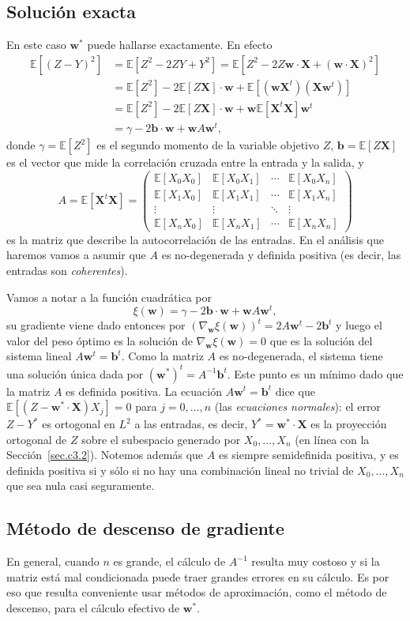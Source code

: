 \documentclass[12pt, a4paper]{amsbook}
\newcommand{\E}{{\mathbb E}}
\newcommand{\ww}{{\mathbf w}}
\newcommand{\bb}{{\mathbf b}}
\newcommand{\XX}{{\mathbf X}}
\theoremstyle{remark}
\theoremstyle{definition}
\numberwithin{section}{chapter}
\numberwithin{subsection}{section}
\numberwithin{equation}{section}
\numberwithin{figure}{chapter}
\begin{document}
\subsection*{Solución exacta} En este caso $\ww^*$ puede hallarse exactamente. En efecto
\begin{align*}
\E[(Z-Y)^2] &= \E[Z^2 - 2ZY + Y^2] = \E[Z^2 - 2Z\ww\cdot \XX + (\ww\cdot\XX)^2]\\
&= \E[Z^2] - 2\E[Z\XX]\cdot\ww + \E[(\ww\XX^t)(\XX\ww^t)]\\
&= \E[Z^2] - 2\E[Z\XX]\cdot\ww + \ww \E[\XX^t \XX]\ww^t\\
&= \gamma-2\bb\cdot \ww + \ww A\ww^t,
\end{align*}
donde $\gamma=\E[Z^2]$ es el segundo momento de la variable objetivo $Z$, $\bb=\E[Z\XX]$ es el vector que mide la correlación cruzada entre la entrada y la salida, y
$$
A =  \E[\XX^t \XX] = \begin{pmatrix}
\E[X_0 X_0] & \E[X_0 X_1] & \cdots & \E[X_0 X_n]\\
\E[X_1 X_0] & \E[X_1 X_1] & \cdots & \E[X_1 X_n]\\
\vdots & \vdots & \ddots & \vdots\\
\E[X_n X_0] & \E[X_n X_1] & \cdots & \E[X_n X_n]
\end{pmatrix}
$$
es la matriz que describe la autocorrelación de las entradas. En el análisis que haremos vamos a asumir que $A$ es no-degenerada y definida positiva (es decir, las entradas son {\em coherentes}).

Vamos a notar a la función cuadrática por
$$
\xi(\ww) = \gamma-2\bb\cdot\ww + \ww A \ww^t,
$$
su gradiente viene dado entonces por $(\nabla_\ww \xi(\ww))^t = 2A\ww^t - 2\bb^t$ y luego el valor del peso óptimo es la solución de $\nabla_\ww \xi(\ww)=0$ que es la solución del sistema lineal $A\ww^t = \bb^t$. Como la matriz $A$ es no-degenerada, el sistema tiene una solución única dada por $(\ww^*)^t = A^{-1}\bb^t$. Este punto es un mínimo dado que la matriz $A$ es definida positiva. La ecuación $A\ww^t=\bb^t$ dice que $\E[(Z-\ww^*\cdot\XX)X_j]=0$ para $j=0,\dots,n$ (las {\em ecuaciones normales}): el error $Z-Y^*$ es ortogonal en $L^2$ a las entradas, es decir, $Y^*=\ww^*\cdot\XX$ es la proyección ortogonal de $Z$ sobre el subespacio generado por $X_0,\dots,X_n$ (en línea con la Sección~\ref{sec.c3.2}). Notemos además que $A$ es siempre semidefinida positiva, y es definida positiva si y sólo si no hay una combinación lineal no trivial de $X_0,\dots,X_n$ que sea nula casi seguramente.

\subsection*{Método de descenso de gradiente} En general, cuando $n$ es grande, el cálculo de $A^{-1}$ resulta muy costoso y si la matriz está mal condicionada puede traer grandes errores en su cálculo. Es por eso que resulta conveniente usar métodos de aproximación, como el método de descenso, para el cálculo efectivo de $\ww^*$.
\end{document}
